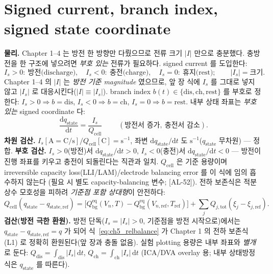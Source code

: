 \documentclass[11pt,a4paper]{article}
\newcommand{\dd}{\mathrm{d}}
\newcommand{\eq}{\mathrm{eq}}
\newcommand{\bg}{\mathrm{bg}}
\newcommand{\cell}{\mathrm{cell}}
\newcommand{\tot}{\mathrm{tot}}
\newcommand{\dis}{\mathrm{dis}}
\newcommand{\chg}{\mathrm{ch}}
\newcommand{\rst}{\mathrm{rest}}
\newcommand{\stt}{\mathrm{state}}
\newcommand{\AL}[1]{\textsf{[AL-#1]}}
\begin{document}
\section{Signed current, branch index, signed state coordinate}\label{sec:ch5_signed}
\textbf{물리.} Chapter 1--4 는 방전 한 방향만 다뤘으므로 전류 크기 $|I|$ 만으로 충분했다. 충방전을 한 구조에
넣으려면 \emph{부호 있는} 전류가 필요하다. signed current 를 도입한다:
\begin{equation}
I_s>0:\ \text{방전(discharge)},\quad I_s<0:\ \text{충전(charge)},\quad I_s=0:\ \text{휴지(rest)};\qquad |I_s|=\text{크기}.
\label{eq:ch5_signed_current}
\end{equation}
Chapter 1--4 의 $|I|$ 는 \emph{방전 기준 magnitude} 였으므로, 앞 장 식에 $I_s$ 를 그대로 넣지 않고 $|I_s|$ 로
대응시킨다($|I|\equiv|I_s|$). branch index $b(t)\in\{\dis,\chg,\rst\}$ 를 부호로 정한다:
$I_s>0\Rightarrow b=\dis$, $I_s<0\Rightarrow b=\chg$, $I_s=0\Rightarrow b=\rst$. 내부 상태 좌표는 \emph{부호
있는} signed coordinate 다:
\begin{equation}
\boxed{\;\frac{\dd q_\stt}{\dd t}=\frac{I_s}{Q_\cell}\;}\qquad(\text{방전서 증가},\ \text{충전서 감소}).
\label{eq:ch5_qstate}
\end{equation}
\textbf{차원 검산.} $I_s[\mathrm A=\mathrm{C/s}]/Q_\cell[\mathrm C]=\mathrm{s^{-1}}$, 좌변 $\dd q_\stt/\dd t$ 도
$\mathrm{s^{-1}}$($q_\stt$ 무차원) — 정합. \textbf{부호 검산.} $I_s>0$(방전)서 $\dd q_\stt/\dd t>0$,
$I_s<0$(충전)서 $\dd q_\stt/\dd t<0$ — 방전이 진행 좌표를 키우고 충전이 되돌린다는 직관과 일치. $Q_\cell$ 은
기준 용량이며 irreversible capacity loss(LLI/LAM)/electrode balancing error 를 이 식에 임의 흡수하지 않는다
(필요 시 별도 capacity-balancing 변수; \AL{52}). 전하 보존식은 적분 상수 모호성을 피하려 \emph{기준점 포함
상대형}이 안전하다:
\begin{equation}
Q_\cell(q_\stt-q_{\stt,\mathrm{ref}})=\big[Q_\bg^{\eq}(V_n,T)-Q_\bg^{\eq}(V_{n,\mathrm{ref}},T_{\mathrm{ref}})\big]
+\sum_j Q_{j,\tot}(\xi_j-\xi_{j,\mathrm{ref}}).
\label{eq:ch5_relbalance}
\end{equation}
\textbf{검산(방전 극한 환원).} 방전 단독($I_s=|I_s|>0$, 기준점을 방전 시작으로)에서는 $q_\stt-q_{\stt,\mathrm{ref}}
=q$ 가 되어 식~\eqref{eq:ch5_relbalance} 가 Chapter 1 의 전하 보존식 (L1) 로 정확히 환원된다(앞 장과 충돌
없음). 실험 plotting 용량은 내부 좌표와 \emph{별개}로 둔다: $Q_\dis=\int_\dis|I_s|\,\dd t$,
$Q_\chg=\int_\chg|I_s|\,\dd t$ (ICA/DVA overlay 용; 내부 상태방정식은 $q_\stt$ 를 따른다).
\end{document}
